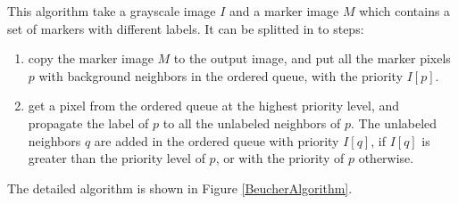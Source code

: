 \documentclass{InsightArticle}
\begin{document}
This algorithm take a grayscale image $I$ and a marker image $M$
which contains a set of markers with different labels. It can be
splitted in to steps:
\begin{enumerate}
  \item copy the marker image $M$ to the output image, and put
all the marker pixels $p$ with background neighbors in the
ordered queue, with the priority $I[p]$.
  \item get a pixel from the ordered queue at the highest
priority level, and propagate the label of $p$ to all the unlabeled
neighbors of $p$. The unlabeled neighbors $q$ are added in the
ordered queue with priority $I[q]$, if $I[q]$ is greater than
the priority level of $p$, or with the priority of $p$ otherwise.
\end{enumerate}

The detailed algorithm is shown in Figure \ref{BeucherAlgorithm}.
\end{document}
